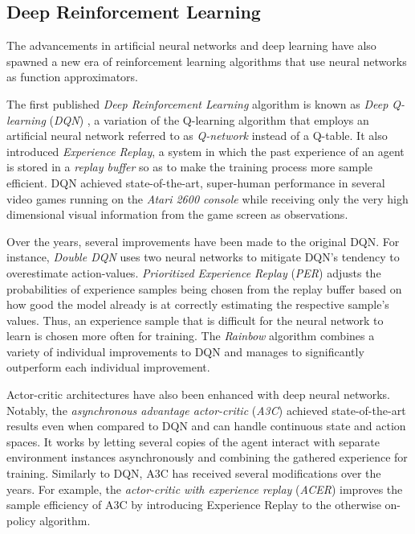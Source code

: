 \subsection{Deep Reinforcement Learning}
The advancements in artificial neural networks and deep learning have also spawned a new era of reinforcement learning algorithms that use neural networks as function approximators.

The first published \textit{Deep Reinforcement Learning} algorithm is known as \textit{Deep Q-learning} (\textit{DQN}) \cite{dqn}, a variation of the Q-learning algorithm that employs an artificial neural network referred to as \textit{Q-network} instead of a Q-table. It also introduced \textit{Experience Replay}, a system in which the past experience of an agent is stored in a \textit{replay buffer} so as to make the training process more sample efficient. DQN achieved state-of-the-art, super-human performance in several video games running on the \textit{Atari 2600 console} while receiving only the very high dimensional visual information from the game screen as observations.

Over the years, several improvements have been made to the original DQN. For instance, \textit{Double DQN} \cite{double-dqn} uses two neural networks to mitigate DQN's tendency to overestimate action-values. \textit{Prioritized Experience Replay} (\textit{PER}) \cite{per} adjusts the probabilities of experience samples being chosen from the replay buffer based on how good the model already is at correctly estimating the respective sample's values. Thus, an experience sample that is difficult for the neural network to learn is chosen more often for training. The \textit{Rainbow} algorithm \cite{rainbow} combines a variety of individual improvements to DQN and manages to significantly outperform each individual improvement.

Actor-critic architectures have also been enhanced with deep neural networks. Notably, the \textit{asynchronous advantage actor-critic} (\textit{A3C}) \cite{a3c} achieved state-of-the-art results even when compared to DQN and can handle continuous state and action spaces. It works by letting several copies of the agent interact with separate environment instances asynchronously and combining the gathered experience for training. Similarly to DQN, A3C has received several modifications over the years. For example, the \textit{actor-critic with experience replay} (\textit{ACER}) \cite{acer} improves the sample efficiency of A3C by introducing Experience Replay to the otherwise on-policy algorithm.

